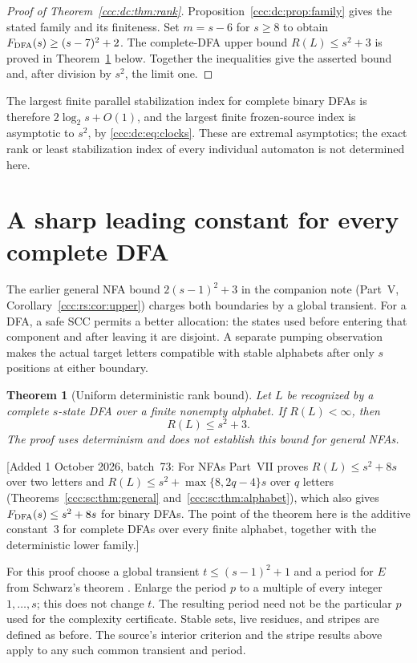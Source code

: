 \documentclass[11pt,letterpaper]{article}
\newtheorem{theorem}{Theorem}[section]
\theoremstyle{definition}
\theoremstyle{remark}
\newcommand{\waddsevthree}[1]{\textup{[}Added 1 October 2026, batch~73: #1\textup{]}}
\begin{document}
\begin{proof}[Proof of Theorem~\ref{ccc:dc:thm:rank}]
Proposition~\ref{ccc:dc:prop:family} gives the stated family and its finiteness. Set $m=s-6$ for $s\ge8$ to obtain $F_{\rm DFA}(s)\ge(s-7)^2+2$. The complete-DFA upper bound $R(L)\le s^2+3$ is proved in Theorem~\ref{ccc:dc:thm:leading-one} below. Together the inequalities give the asserted bound and, after division by $s^2$, the limit one.
\end{proof}

The largest finite parallel stabilization index for complete binary DFAs is therefore $2\log_2s+O(1)$, and the largest finite frozen-source index is asymptotic to $s^2$, by \eqref{ccc:dc:eq:clocks}. These are extremal asymptotics; the exact rank or least stabilization index of every individual automaton is not determined here.


\section{A sharp leading constant for every complete DFA}\label{ccc:dc:sec:leading-one}

The earlier general NFA bound $2(s-1)^2+3$ in the companion note (Part~V, Corollary~\ref{ccc:rs:cor:upper}) charges both boundaries by a global transient. For a DFA, a safe SCC permits a better allocation: the states used before entering that component and after leaving it are disjoint. A separate pumping observation makes the actual target letters compatible with stable alphabets after only $s$ positions at either boundary.

\begin{theorem}[Uniform deterministic rank bound]\label{ccc:dc:thm:leading-one}
Let $L$ be recognized by a complete $s$-state DFA over a finite nonempty alphabet. If $R(L)<\infty$, then
\[
R(L)\le s^2+3.
\]
The proof uses determinism and does not establish this bound for general NFAs.
\end{theorem}
\waddsevthree{For NFAs Part~VII proves $R(L)\le s^2+8s$ over two letters and
$R(L)\le s^2+\max\{8,2q-4\}s$ over $q$ letters
(Theorems~\ref{ccc:sc:thm:general} and~\ref{ccc:sc:thm:alphabet}), which also
gives $F_{\rm DFA}(s)\le s^2+8s$ for binary DFAs. The point of the theorem
here is the additive constant~$3$ for complete DFAs over every finite
alphabet, together with the deterministic lower family.}

For this proof choose a global transient $t\le(s-1)^2+1$ and a period for $E$ from Schwarz's theorem \cite[Theorem~4.3]{Schwarz}. Enlarge the period $p$ to a multiple of every integer $1,\ldots,s$; this does not change $t$. The resulting period need not be the particular $p$ used for the complexity certificate. Stable sets, live residues, and stripes are defined as before. The source's interior criterion and the stripe results above apply to any such common transient and period.
\end{document}
